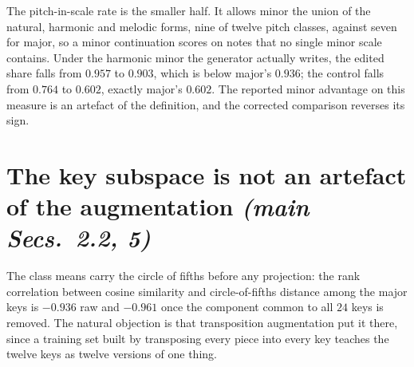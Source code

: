 \documentclass{article}
\begin{document}
The pitch-in-scale rate is the smaller half. It allows minor the union of the natural,
harmonic and melodic forms, nine of twelve pitch classes, against seven for major,
so a minor continuation scores on notes that no single minor scale contains. Under the
harmonic minor the generator actually writes, the edited share falls from $0.957$ to
$0.903$, which is below major's $0.936$; the control falls from $0.764$ to $0.602$,
exactly major's $0.602$. The reported minor advantage on this measure is an artefact of
the definition, and the corrected comparison reverses its sign.

\section{The key subspace is not an artefact of the augmentation \normalfont\textit{(main Secs.~2.2, 5)}}
\label{sec:augmentation}
%

The class means carry the circle of fifths before any projection: the rank correlation
between cosine similarity and circle-of-fifths distance among the major keys is $-0.936$
raw and $-0.961$ once the component common to all $24$ keys is removed. The natural
objection is that transposition augmentation put it there, since a training set built by
transposing every piece into every key teaches the twelve keys as twelve versions of one
thing.
\end{document}
